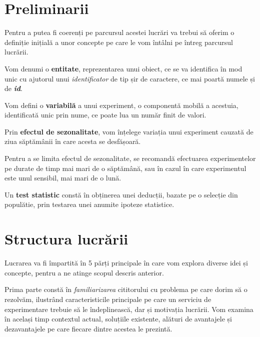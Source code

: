 \section{Preliminarii}

Pentru a putea fi coerenți pe parcursul acestei lucrări va trebui să oferim o definiție inițială a unor concepte pe care le vom întâlni pe întreg parcursul lucrării.

\begin{definition}
	\label{def_entity}
	Vom denumi o \textbf{entitate}, reprezentarea unui obiect, ce se va identifica în mod unic cu ajutorul unui \textit{identificator} de tip șir de caractere, ce mai poartă numele și de \textit{\textbf{id}}.
\end{definition}

\begin{definition}
	Vom defini o \textbf{variabilă} a unui experiment, o componentă mobilă a acestuia, identificată unic prin nume, ce poate lua un număr finit de valori.
\end{definition}

\begin{definition}
	Prin \textbf{efectul de sezonalitate}, vom înțelege variația unui experiment cauzată de ziua săptămânii în care acesta se desfășoară.
\end{definition}

\begin{remark}
	Pentru a se limita efectul de sezonalitate, se recomandă efectuarea experimentelor pe durate de timp mai mari de o săptămână, sau în cazul în care experimentul este unul sensibil, mai mari de o lună.
\end{remark}

\begin{definition}
	Un \textbf{test statistic} constă în obținerea unei deducții, bazate pe o selecție din populătie, prin testarea unei anumite ipoteze statistice.
\end{definition}

\section{Structura lucrării}

Lucrarea va fi împartită în 5 părți principale în care vom explora diverse idei și concepte, pentru a ne atinge scopul descris anterior. 

Prima parte constă în \textit{familiarizarea} cititorului cu problema pe care dorim să o rezolvăm, ilustrând caracteristicile principale pe care un serviciu de experimentare trebuie să le îndeplinească, dar și motivația lucrării. Vom examina în același timp contextul actual, soluțiile existente, alături de avantajele și dezavantajele pe care fiecare dintre acestea le prezintă.

